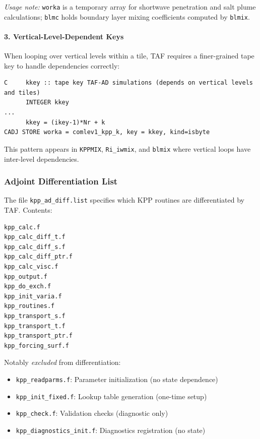 \documentclass[12pt,letterpaper]{article}
\begin{document}
\textit{Usage note:} \texttt{worka} is a temporary array for shortwave penetration
and salt plume calculations; \texttt{blmc} holds boundary layer mixing coefficients
computed by \texttt{blmix}.

\paragraph{3. Vertical-Level-Dependent Keys}

When looping over vertical levels within a tile, TAF requires a finer-grained
tape key to handle dependencies correctly:

\begin{lstlisting}[language=Fortran90KPP]
C     kkey :: tape key TAF-AD simulations (depends on vertical levels and tiles)
      INTEGER kkey
...
      kkey = (ikey-1)*Nr + k
CADJ STORE worka = comlev1_kpp_k, key = kkey, kind=isbyte
\end{lstlisting}

This pattern appears in \texttt{KPPMIX}, \texttt{Ri\_iwmix}, and \texttt{blmix}
where vertical loops have inter-level dependencies.

\subsubsection{Adjoint Differentiation List}

The file \texttt{kpp\_ad\_diff.list} specifies which KPP routines are differentiated
by TAF. Contents:

\begin{lstlisting}[language=bash, caption={\texttt{pkg/kpp/kpp\_ad\_diff.list}}]
kpp_calc.f
kpp_calc_diff_t.f
kpp_calc_diff_s.f
kpp_calc_diff_ptr.f
kpp_calc_visc.f
kpp_output.f
kpp_do_exch.f
kpp_init_varia.f
kpp_routines.f
kpp_transport_s.f
kpp_transport_t.f
kpp_transport_ptr.f
kpp_forcing_surf.f
\end{lstlisting}

Notably \textit{excluded} from differentiation:
\begin{itemize}[leftmargin=*]
  \item \texttt{kpp\_readparms.f}: Parameter initialization (no state dependence)
  \item \texttt{kpp\_init\_fixed.f}: Lookup table generation (one-time setup)
  \item \texttt{kpp\_check.f}: Validation checks (diagnostic only)
  \item \texttt{kpp\_diagnostics\_init.f}: Diagnostics registration (no state)
\end{itemize}
\end{document}
